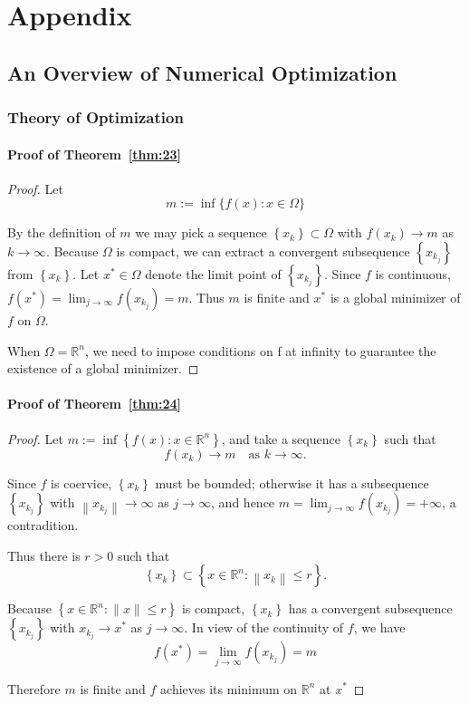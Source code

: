 \chapter{Appendix}
\renewcommand{\thesection}{\Alph{section}}
\label{app:appendix}
\section{An Overview of Numerical Optimization}
\subsection{Theory of Optimization}

\subsubsection{Proof of Theorem~\ref{thm:23}}
\label{appendix:trm23}
\begin{proof}
Let 
$$
m:=\inf \{f(x): x \in \Omega\}
$$
\par By the definition of $m$ we may pick a sequence $\left\{x_{k}\right\} \subset \Omega$ with $f\left(x_{k}\right) \rightarrow m$ as $k \rightarrow \infty$. Because $\Omega$ is compact, we can extract a convergent subsequence $\left\{x_{k_j}\right\}$ from $\left\{x_{k}\right\}$. Let $x^{*} \in \Omega$ denote the limit point of $\left\{x_{k_j}\right\}$. Since $f$ is continuous, $f\left(x^{*}\right)=\lim _{j \rightarrow \infty} f\left(x_{k_{j}}\right)=m$. Thus $m$ is finite and $x^{*}$ is a global minimizer of $f$ on $\Omega$. 
\par When $\Omega = \mathbb{R}^n$, we need to impose conditions on f at infinity to guarantee the existence of a global minimizer.
\end{proof}

\subsubsection{Proof of Theorem~\ref{thm:24}}
\label{appendix:trm24}
\begin{proof}
Let $m:=\inf \left\{f(x): x \in \mathbb{R}^{n}\right\}$, and take a sequence $\left\{x_{k}\right\}$ such that 
$$
f\left(x_{k}\right) \rightarrow m \quad \textrm{as }  k \rightarrow \infty .
$$
\par Since $f$ is coervice, $\left\{x_{k}\right\}$ must be bounded; otherwise it has a subsequence $\left\{x_{k_j}\right\}$ with $\left\|x_{k_{j}}\right\| \rightarrow \infty$ as $j \rightarrow \infty$, and hence $m=\lim _{j \rightarrow \infty} f\left(x_{k_{j}}\right)=+\infty$, a contradition. 
\par Thus there is $r > 0$ such that
$$
\left\{x_{k}\right\} \subset\left\{x \in \mathbb{R}^{n}:\left\|x_{k}\right\| \leq r\right\}.
$$
\par Because $\left\{x \in \mathbb{R}^{n}:\|x\| \leq r\right\}$ is compact, $\left\{x_{k}\right\}$ has a convergent subsequence $\left\{x_{k_j}\right\}$ with $x_{k_{j}} \rightarrow x^{*}$ as $j \rightarrow \infty$. In view of the continuity of $f$, we have 
$$
f\left(x^{*}\right)=\lim _{j \rightarrow \infty} f\left(x_{k_{j}}\right)=m
$$
\par Therefore $m$ is finite and $f$ achieves its minimum on $\mathbb{R}^n$ at $x^{*}$
\end{proof}
